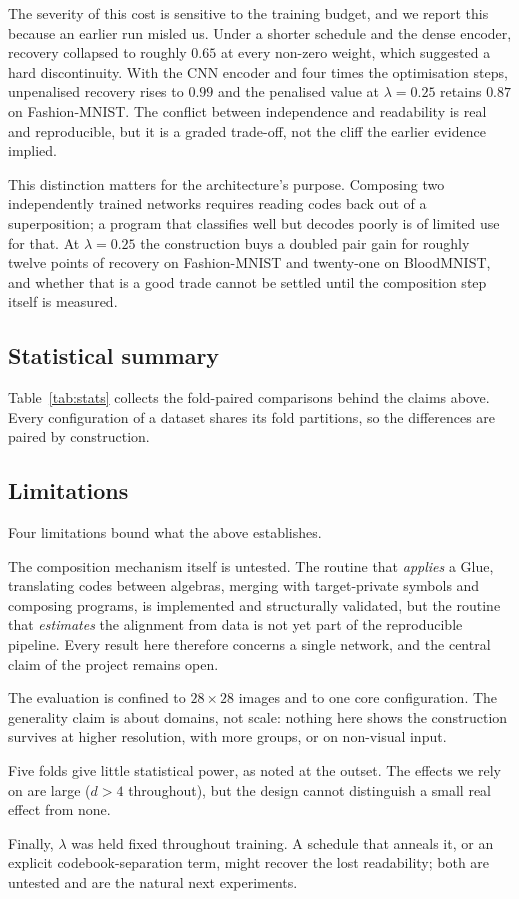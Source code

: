 The severity of this cost is sensitive to the training budget, and we report
this because an earlier run misled us. Under a shorter schedule and the dense
encoder, recovery collapsed to roughly $0.65$ at every non-zero weight, which
suggested a hard discontinuity. With the CNN encoder and four times the
optimisation steps, unpenalised recovery rises to $0.99$ and the penalised
value at $\lambda=0.25$ retains $0.87$ on Fashion-MNIST. The conflict between
independence and readability is real and reproducible, but it is a graded
trade-off, not the cliff the earlier evidence implied.

This distinction matters for the architecture's purpose. Composing two
independently trained networks requires reading codes back out of a
superposition; a program that classifies well but decodes poorly is of limited
use for that. At $\lambda=0.25$ the construction buys a doubled pair gain for
roughly twelve points of recovery on Fashion-MNIST and twenty-one on
BloodMNIST, and whether that is a good trade cannot be settled until the
composition step itself is measured.

\subsection{Statistical summary}

Table~\ref{tab:stats} collects the fold-paired comparisons behind the claims
above. Every configuration of a dataset shares its fold partitions, so the
differences are paired by construction.



\subsection{Limitations}

Four limitations bound what the above establishes.

The composition mechanism itself is untested. The routine that \emph{applies} a
Glue, translating codes between algebras, merging with target-private symbols
and composing programs, is implemented and structurally validated,
but the routine that \emph{estimates} the alignment from data is not yet part of
the reproducible pipeline. Every result here therefore concerns a single
network, and the central claim of the project remains open.

The evaluation is confined to $28\times28$ images and to one core
configuration. The generality claim is about domains, not scale: nothing here
shows the construction survives at higher resolution, with more groups, or on
non-visual input.

Five folds give little statistical power, as noted at the outset. The effects we
rely on are large ($d > 4$ throughout), but the design cannot distinguish a
small real effect from none.

Finally, $\lambda$ was held fixed throughout training. A schedule that anneals
it, or an explicit codebook-separation term, might recover the lost readability;
both are untested and are the natural next experiments.
